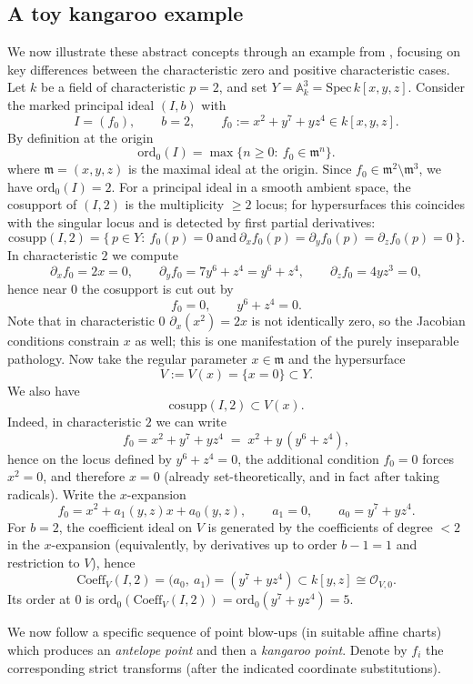 \documentclass[11pt]{amsart}
\begin{document}
\subsection{A toy kangaroo example}\label{subsec:kangoroo}
We now illustrate these abstract concepts through an example from \cite{Hauser2010}, focusing on key differences between the characteristic zero and positive characteristic cases. Let $k$ be a field of characteristic $p=2$, and set $Y=\mathbb{A}_k^3=\mathrm{Spec}\,k[x,y,z]$. 
Consider the marked principal ideal $(I,b)$ with
\[
I=(f_0),\qquad b=2,\qquad f_0:=x^2+y^7+yz^4\in k[x,y,z].
\]
By definition at the origin 
\[
\mathrm{ord}_0(I)=\max\{n\ge 0:\ f_0\in \mathfrak m^n\}.
\]
where $\mathfrak{m}=(x,y,z)$ is the maximal ideal at the origin. 
Since $f_0\in\mathfrak m^2\setminus \mathfrak m^3$, we have $\mathrm{ord}_0(I)=2$.
For a principal ideal in a smooth ambient space, the cosupport of $(I,2)$ is the
multiplicity $\ge 2$ locus; for hypersurfaces this coincides with the singular locus and is detected by
first partial derivatives:
\[
\mathrm{cosupp}(I,2)=\{\,p\in Y:\ f_0(p)=0\ \text{and}\ \partial_x f_0(p)=\partial_y f_0(p)=\partial_z f_0(p)=0\,\}.
\]
In characteristic $2$ we compute
\[
\partial_x f_0 = 2x = 0,\qquad
\partial_y f_0 = 7y^6 + z^4 = y^6+z^4,\qquad
\partial_z f_0 = 4yz^3 = 0,
\]
hence near $0$ the cosupport is cut out by
\[
f_0=0,\qquad y^6+z^4=0.
\]
Note that in characteristic $0$ $\partial_x(x^2)=2x$ is not identically zero, so the Jacobian
conditions constrain $x$ as well; this is one manifestation of the purely inseparable pathology. Now take the regular parameter $x\in \mathfrak m$ and the hypersurface
\[
V:=V(x)=\{x=0\}\subset Y.
\]
We also have
\[
\mathrm{cosupp}(I,2)\subset V(x).
\]
Indeed, in characteristic $2$ we can write
\[
f_0=x^2+y^7+yz^4 \;=\; x^2 + y\,(y^6+z^4),
\]
hence on the locus defined by $y^6+z^4=0$, the additional condition $f_0=0$ forces $x^2=0$, and therefore
$x=0$ (already set-theoretically, and in fact after taking radicals).
Write the $x$-expansion
\[
f_0=x^2+a_1(y,z)x+a_0(y,z),\qquad a_1=0,\qquad a_0=y^7+yz^4.
\]
For $b=2$, the coefficient ideal on $V$ is generated by the coefficients of degree $<2$ in the
$x$-expansion (equivalently, by derivatives up to order $b-1=1$ and restriction to $V$), hence
\[
\mathrm{Coeff}_V(I,2)=\bigl(a_0,\ a_1\bigr)=(y^7+yz^4)\subset k[y,z]\cong \mathcal{O}_{V,0}.
\]
Its order at $0$ is $\mathrm{ord}_0(\mathrm{Coeff}_V(I,2))=\mathrm{ord}_0(y^7+yz^4)=5$.

We now follow a specific sequence of point blow-ups (in suitable affine charts) which produces an
\emph{antelope point} and then a \emph{kangaroo point}.  Denote by $f_i$ the corresponding strict transforms
(after the indicated coordinate substitutions).
\end{document}
